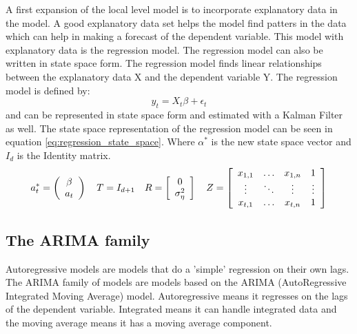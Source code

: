 A first expansion of the local level model is to incorporate explanatory data in the model. A good explanatory data set helps the model find patters in the data which can help in making a forecast of the dependent variable. This model with explanatory data is the regression model.  The regression model can also be written in state space form. The regression model finds linear relationships between the explanatory data X and the dependent variable Y. The regression model is defined by:$$y_t = X_t\beta + \epsilon_t$$ and can be represented in state space form and estimated with a Kalman Filter as well. The state space representation of the regression model can be seen in equation \ref{eq:regression_state_space}. Where $\alpha^*$ is the new state space vector and $I_d$ is the Identity matrix.\\

\begin{equation}
    a^*_t = \left(\begin{array}{c} \beta \\ a_t \end{array} \right) \quad
    T = I_{d+1} \quad
    R = \left[\begin{array}{c} 0 \\ \sigma_\eta^2\\\end{array}\right] \quad
    Z = \left[\begin{array}{c c c c}
        x_{1,1} & \hdots & x_{1,n} &  1 \\
        \vdots &  \ddots& \vdots & \vdots \\
        x_{t,1} & \hdots & x_{t,n} & 1 \\
    \end{array}\right]
\label{eq:regression_state_space}
\end{equation}

\subsection{The ARIMA family}
Autoregressive models are models that do a 'simple' regression on their own lags. The ARIMA family of models are models based on the ARIMA (AutoRegressive Integrated Moving Average) model. Autoregressive means it regresses on the lags of the dependent variable. Integrated means it can handle integrated data and the moving average means it has a moving average component.

